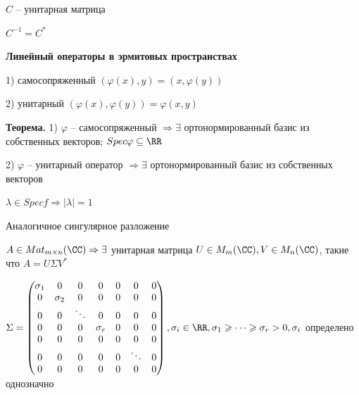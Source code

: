 $C$ -- унитарная матрица

$C^{-1} = C^*$

\bigskip
\textbf{Линейный операторы в эрмитовых пространствах}

1) самосопряженный $(\varphi(x), y) = (x, \varphi(y))$

2) унитарный $(\varphi(x), \varphi(y)) = \varphi(x, y)$

\bigskip
\textbf{Теорема.} 1) $\varphi$ -- самосопряженный $\Rightarrow \exists$ ортонормированный базис из собственных векторов; $Spec \varphi \subseteq \RR$

2) $\varphi$ -- унитарный оператор $\Rightarrow \exists$ ортонормированный базис из собственных векторов

$\lambda \in Spec f \Rightarrow |\lambda| = 1$

\bigskip
Аналогичное сингулярное разложение

\bigskip
$A \in Mat_{m \times n} (\CC) \Rightarrow \exists$ унитарная матрица $U \in M_m(\CC), V \in M_n (\CC)$, такие что $A = U \Sigma V^*$

$\Sigma = \begin{pmatrix} \sigma_1 & 0 & 0 & 0 & 0 & 0 & 0 \\  0 & \sigma_2 & 0 & 0 & 0 & 0 & 0 \\ 0 & 0 & \ddots & 0 & 0 & 0 & 0 \\ 0 & 0 & 0 & \sigma_r & 0 & 0 & 0 \\ 0 & 0 & 0 & 0 & 0 & 0 & 0 \\ 0 & 0 & 0 & 0 & 0 & \ddots & 0 \\ 0 & 0 & 0 & 0 & 0 & 0 & 0 \end{pmatrix}, \sigma_i \in \RR, \sigma_1 \geqslant \dots \geqslant \sigma_r > 0, \sigma_i$ определено однозначно 























